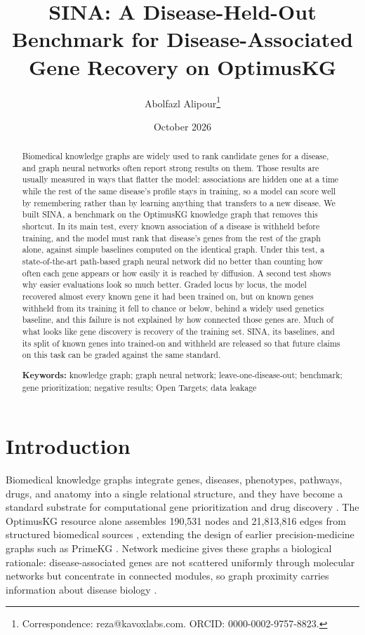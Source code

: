 \documentclass[11pt]{article}
\title{SINA: A Disease-Held-Out Benchmark for Disease-Associated Gene Recovery on OptimusKG}
\author{Abolfazl Alipour\thanks{Correspondence: reza@kavoxlabs.com. ORCID: 0000-0002-9757-8823.}}
\date{October 2026}
\begin{document}
\maketitle

\begin{abstract}
\noindent Biomedical knowledge graphs are widely used to rank candidate genes for a disease, and graph neural networks often report strong results on them. Those results are usually measured in ways that flatter the model: associations are hidden one at a time while the rest of the same disease's profile stays in training, so a model can score well by remembering rather than by learning anything that transfers to a new disease. We built SINA, a benchmark on the OptimusKG knowledge graph that removes this shortcut. In its main test, every known association of a disease is withheld before training, and the model must rank that disease's genes from the rest of the graph alone, against simple baselines computed on the identical graph. Under this test, a state-of-the-art path-based graph neural network did no better than counting how often each gene appears or how easily it is reached by diffusion. A second test shows why easier evaluations look so much better. Graded locus by locus, the model recovered almost every known gene it had been trained on, but on known genes withheld from its training it fell to chance or below, behind a widely used genetics baseline, and this failure is not explained by how connected those genes are. Much of what looks like gene discovery is recovery of the training set. SINA, its baselines, and its split of known genes into trained-on and withheld are released so that future claims on this task can be graded against the same standard.

\medskip
\noindent\textbf{Keywords:} knowledge graph; graph neural network; leave-one-disease-out; benchmark; gene prioritization; negative results; Open Targets; data leakage
\end{abstract}

\section{Introduction}

Biomedical knowledge graphs integrate genes, diseases, phenotypes, pathways, drugs, and anatomy into a single relational structure, and they have become a standard substrate for computational gene prioritization and drug discovery \cite{vittor2026,chandak2023}. The OptimusKG resource alone assembles 190,531 nodes and 21,813,816 edges from structured biomedical sources \cite{vittor2026}, extending the design of earlier precision-medicine graphs such as PrimeKG \cite{chandak2023}. Network medicine gives these graphs a biological rationale: disease-associated genes are not scattered uniformly through molecular networks but concentrate in connected modules, so graph proximity carries information about disease biology \cite{menche2015,himmelstein2017}.
\end{document}
